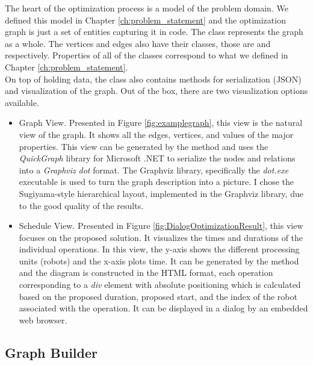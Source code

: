 The heart of the optimization process is a model of the problem domain.  We defined this model in Chapter \ref{ch:problem_statement} and the optimization graph is just a set of entities capturing it in code. The  class represents the graph as a whole. The vertices and edges also have their classes, those are  and  respectively. Properties of all of the classes correspond to what we defined in Chapter \ref{ch:problem_statement}. \\

On top of holding data, the  class also contains methods for serialization (JSON) and visualization of the graph. Out of the box, there are two visualization options available.

\begin{itemize}
    \item Graph View. Presented in Figure \ref{fig:examplegraph}, this view is the natural view of the graph. It shows all the edges, vertices, and values of the major properties. This view can be generated by the  method and uses the \emph{QuickGraph} library for Microsoft .NET to serialize the nodes and relations into a \emph{Graphviz} \cite{Graphviz} \emph{dot} format. The Graphviz library, specifically the \emph{dot.exe} executable is used to turn the graph description into a picture. I chose the Sugiyama-style \cite{GraphvizLayout} hierarchical layout, implemented in the Graphviz library, due to the good quality of the results.

    \item Schedule View. Presented in Figure \ref{fig:DialogOptimizationResult}, this view focuses on the proposed solution. It visualizes the times and durations of the individual operations. In this view, the y-axis shows the different processing units (robots) and the x-axis plots time. It can be generated by the  method and the diagram is constructed in the HTML format, each operation corresponding to a \emph{div} element with absolute positioning which is calculated based on the proposed duration, proposed start, and the index of the robot associated with the operation. It can be displayed in a dialog by an embedded web browser.

\end{itemize}

\subsection{Graph Builder}

